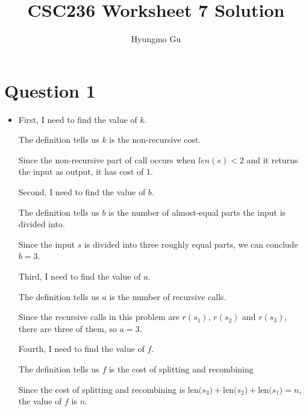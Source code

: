 \documentclass[12pt]{article}
\begin{document}
\title{CSC236 Worksheet 7 Solution}
\author{Hyungmo Gu}
\maketitle

\section*{Question 1}
\begin{itemize}
    \item

    First, I need to find the value of $k$.

    \bigskip

    The definition tells us $k$ is the non-recursive cost.

    \bigskip

    Since the non-recursive part of call occurs when $len(s) < 2$ and it
    returns the input as output, it has cost of 1.

    \bigskip

    Second, I need to find the value of $b$.

    \bigskip

    The definition tells us $b$ is the number of almost-equal parts the input
    is divided into.

    \bigskip

    Since the input $s$ is divided into three roughly equal parts, we can conclude $b = 3$.

    \bigskip

    Third, I need to find the value of $a$.

    \bigskip

    The definition tells us $a$ is the number of recursive calls.

    \bigskip

    Since the recursive calls in this problem are $r(s_1)$, $r(s_2)$ and $r(s_3)$,
    there are three of them, so $a = 3$.

    \bigskip

    Fourth, I need to find the value of $f$.

    \bigskip

    The definition tells us $f$ is the cost of splitting and recombining

    \bigskip

    Since the cost of splitting and recombining is $\text{len($s_3$)} + \text{len($s_2$)} + \text{len($s_1$)} = n$,
    the value of $f$ is $n$.


\end{itemize}
\end{document}

